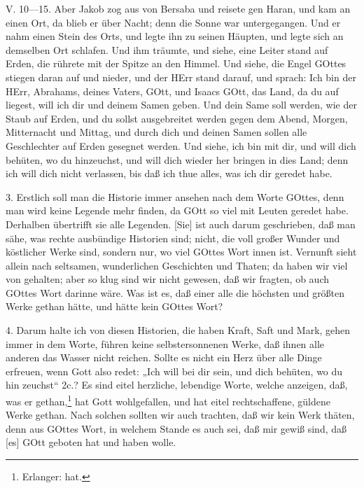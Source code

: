\begin{schriftzitat}
V. 10—15. Aber Jakob zog aus von Bersaba und reisete gen Haran, und kam an einen Ort, da blieb er über Nacht; denn die Sonne war untergegangen. Und er nahm einen Stein des Orts, und legte ihn zu seinen Häupten, und legte sich an demselben Ort schlafen. Und ihm träumte, und siehe, eine Leiter stand auf Erden, die rührete mit der Spitze an den Himmel. Und siehe, die Engel GOttes stiegen daran auf und nieder, und der HErr stand darauf, und sprach: Ich bin der HErr, Abrahams, deines Vaters, GOtt, und Isaacs GOtt, das Land, da du auf liegest, will ich dir und deinem Samen geben. Und dein Same soll werden, wie der Staub auf Erden, und du sollst ausgebreitet werden gegen dem Abend, Morgen, Mitternacht und Mittag, und durch dich und deinen Samen sollen alle Geschlechter auf Erden gesegnet werden. Und siehe, ich bin mit dir, und will dich behüten, wo du hinzeuchst, und will dich wieder her bringen in dies Land; denn ich will dich nicht verlassen, bis daß ich thue alles, was ich dir geredet habe.
\end{schriftzitat}

3. Erstlich soll man die Historie immer ansehen nach dem Worte GOttes, denn man wird keine Legende mehr finden, da GOtt so viel mit Leuten geredet habe. Derhalben übertrifft sie alle Legenden. [Sie] ist auch darum geschrieben, daß man sähe, was rechte ausbündige Historien sind; nicht, die voll großer Wunder und köstlicher Werke sind, sondern nur, wo viel GOttes Wort innen ist. Vernunft sieht allein nach seltsamen, wunderlichen Geschichten und Thaten; da haben wir viel von gehalten; aber so klug sind wir nicht gewesen, daß wir fragten, ob auch GOttes Wort darinne wäre. Was ist es, daß einer alle die höchsten und größten Werke gethan hätte, und hätte kein GOttes Wort?

4. Darum halte ich von diesen Historien, die haben Kraft, Saft und Mark, gehen immer in dem Worte, führen keine selbstersonnenen Werke, daß ihnen alle anderen das Wasser nicht reichen. Sollte es nicht ein Herz über alle Dinge erfreuen, wenn Gott also redet: „Ich will bei dir sein, und dich behüten, wo du hin zeuchst“ 2c.? Es sind eitel herzliche, lebendige Worte, welche anzeigen, daß, was er gethan,\footnote{Erlanger: hat.} hat Gott wohlgefallen, und hat eitel rechtschaffene, güldene Werke gethan. Nach solchen sollten wir auch trachten, daß wir kein Werk thäten, denn aus GOttes Wort, in welchem Stande es auch sei, daß mir gewiß sind, daß [es] GOtt geboten hat und haben wolle.

